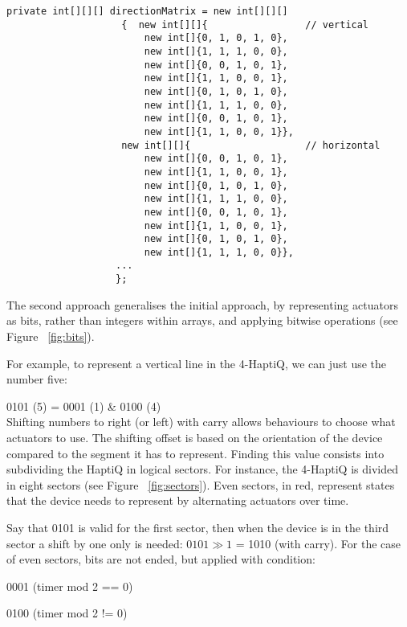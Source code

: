 \lstset{style=sharpc1}
\begin{lstlisting}[caption={Tactons - Initial approach},label={lst:tactonsInitialApproach}]
private int[][][] directionMatrix = new int[][][]
                    {  new int[][]{                 // vertical 
                        new int[]{0, 1, 0, 1, 0}, 
                        new int[]{1, 1, 1, 0, 0}, 
                        new int[]{0, 0, 1, 0, 1}, 
                        new int[]{1, 1, 0, 0, 1}, 
                        new int[]{0, 1, 0, 1, 0}, 
                        new int[]{1, 1, 1, 0, 0}, 
                        new int[]{0, 0, 1, 0, 1}, 
                        new int[]{1, 1, 0, 0, 1}}, 
                    new int[][]{                    // horizontal
                        new int[]{0, 0, 1, 0, 1},
                        new int[]{1, 1, 0, 0, 1},
                        new int[]{0, 1, 0, 1, 0},
                        new int[]{1, 1, 1, 0, 0},
                        new int[]{0, 0, 1, 0, 1},
                        new int[]{1, 1, 0, 0, 1},
                        new int[]{0, 1, 0, 1, 0},
                        new int[]{1, 1, 1, 0, 0}},
                   ...
                   };
\end{lstlisting}

The second approach generalises the initial approach, by representing actuators as bits, rather than integers within arrays, and applying bitwise operations (see Figure ~\ref{fig:bits}). 

For example, to represent a vertical line in the 4-HaptiQ, we can just use the number five:

		0101 (5) = 0001 (1) \& 0100 (4) \\
Shifting numbers to right (or left) with carry allows behaviours to choose what actuators to use. 
The shifting offset is based on the orientation of the device compared to the segment it has to represent. Finding this value consists into subdividing the HaptiQ in logical sectors. For instance, the 4-HaptiQ is divided in eight sectors (see Figure ~\ref{fig:sectors}). Even sectors, in red, represent states that the device needs to represent by alternating actuators over time.

Say that 0101 is valid for the first sector, then when the device is in the third sector a shift by one only is needed: $0101 \gg 1$ = 1010 (with carry). For the case of even sectors, bits are not ended, but applied with condition:

		0001 (timer mod 2 == 0)
        
        0100 (timer mod 2 != 0)

